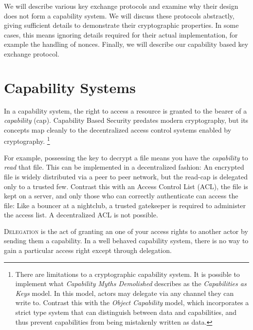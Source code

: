 \documentclass[12pt]{article}
\begin{document}
We will describe various key exchange protocols and examine why their
design does not form a capability system. We will discuss these
protocols abstractly, giving sufficient details to demonstrate their
cryptographic properties. In some cases, this means ignoring details
required for their actual implementation, for example the handling of
nonces. Finally, we will describe our capability based key exchange
protocol.

\section{Capability Systems}

In a capability system, the right to access a resource is granted
to the bearer of a \emph{capability} (cap). Capability
Based Security predates modern cryptography, but its concepts
map cleanly to the decentralized access control systems
enabled by cryptography. \footnote{
  There are limitations to a cryptographic capability system.
  It is possible to implement what \emph{Capability Myths Demolished}\cite{capmyths}
  describes as the \emph{Capabilities as Keys} model. In this model,
  actors may delegate via any channel they can write to.
  Contrast this with the \emph{Object Capability} model, which incorporates
  a strict type system that can distinguish between data and capabilities,
  and thus prevent capabilities from being mistakenly written as data.
}

For example, possessing the key to decrypt a file means you have
the \emph{capability} to \emph{read} that file. This can be implemented
in a decentralized fashion: An encrypted file is widely distributed
via a peer to peer network, but the read-cap is delegated
only to a trusted few.  Contrast this with an Access
Control List (ACL), the file is kept on a server, and only those
who can correctly authenticate can access the file: Like a bouncer
at a nightclub, a trusted gatekeeper is required to administer the
access list. A decentralized ACL is not possible.


\textsc{Delegation} is the act of granting an one of your access
rights to another actor by sending them a capability.
In a well behaved capability system, there is no way to gain a
particular access right except through delegation.
\end{document}
